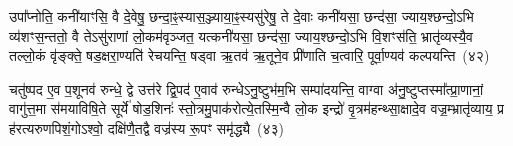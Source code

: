 उपा᳚प्नोति॒ कनी॑याꣳसि॒ वै दे॒वेषु॒ छन्दा॒ꣴ॒स्यास॒ञ्ज्याया॒ꣴ॒स्यसु॑रेषु॒ ते दे॒वाः कनी॑यसा॒ छन्द॑सा॒ ज्याय॒श्छन्दो॒\-ऽभि व्य॑शꣳस॒न्ततो॒ वै ते\-ऽसु॑राणां लो॒कम॑वृञ्जत॒ यत्कनी॑यसा॒ छन्द॑सा॒ ज्याय॒श्छन्दो॒\-ऽभि वि॒शꣳस॑ति॒ भ्रातृ॑व्यस्यै॒व तल्लो॒कं वृ॑ङ्क्ते॒ षड॒क्षरा॒ण्यति॑ रेचयन्ति॒ षड्वा ऋ॒तव॑ ऋ॒तूने॒व प्री॑णाति च॒त्वारि॒ पूर्वा॒ण्यव॑ कल्पयन्ति~(४२)

चतु॑ष्पद ए॒व प॒शूनव॑ रुन्धे॒ द्वे उत्त॑रे द्वि॒पद॑ ए॒वाव॑ रुन्धे\-ऽनु॒ष्टुभ॑म॒भि सम्पा॑दयन्ति॒ वाग्वा अ॑नु॒ष्टुप्तस्मा᳚त्प्रा॒णानां॒ वागु॑त्त॒मा स॑मयाविषि॒ते सूर्ये॑ षोड॒शिनः॑ स्तो॒त्रमु॒पाक॑रोत्ये॒तस्मि॒न्वै लो॒क इन्द्रो॑ वृ॒त्रम॑हन्थ्सा॒क्षादे॒व वज्र॒म्भ्रातृ॑व्याय॒ प्र ह॑रत्यरुणपिशं॒गो\-ऽश्वो॒ दक्षि॑णै॒तद्वै वज्र॑स्य रू॒पꣳ समृ॑द्ध्यै~(४३)


{}%

